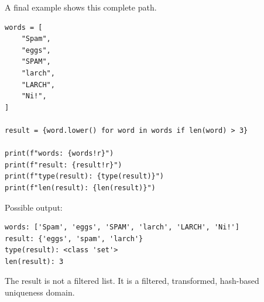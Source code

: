 A final example shows this complete path.

\begin{verbatim}
words = [
    "Spam",
    "eggs",
    "SPAM",
    "larch",
    "LARCH",
    "Ni!",
]

result = {word.lower() for word in words if len(word) > 3}

print(f"words: {words!r}")
print(f"result: {result!r}")
print(f"type(result): {type(result)}")
print(f"len(result): {len(result)}")
\end{verbatim}

Possible output:

\begin{verbatim}
words: ['Spam', 'eggs', 'SPAM', 'larch', 'LARCH', 'Ni!']
result: {'eggs', 'spam', 'larch'}
type(result): <class 'set'>
len(result): 3
\end{verbatim}

The result is not a filtered list. It is a filtered, transformed, hash-based uniqueness domain.